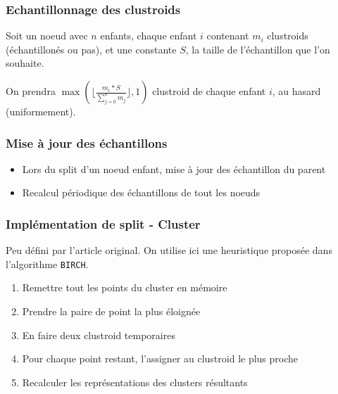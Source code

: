 \documentclass{beamer}
\begin{document}
 	
 	\begin{frame}
 		\frametitle{Echantillonnage des clustroids}
 		Soit un noeud avec $n$ enfants, chaque enfant $i$ contenant $m_i$ clustroids (échantillonés ou pas), et une constante $S$, la taille de l'échantillon que l'on souhaite.
 		
 		On prendra $\max(\lfloor\frac{m_i*S}{\sum_{j=0}^n m_j}\rfloor,1)$ clustroid de chaque enfant $i$, au hasard (uniformement).
 	\end{frame}
 	
 	\begin{frame}
 		\frametitle{Mise à jour des échantillons}
 		\begin{itemize}
 			\item Lors du split d'un noeud enfant, mise à jour des échantillon du parent
 			\item Recalcul périodique des échantillons de tout les noeuds
 		\end{itemize}
 	\end{frame}
 	
 	\begin{frame}
 		\frametitle{Implémentation de split - Cluster}
 		Peu défini par l'article original. On utilise ici une heuristique proposée dans l'algorithme \texttt{BIRCH}.
 		\begin{enumerate}
 			\item Remettre tout les points du cluster en mémoire
 			\item Prendre la paire de point la plus éloignée
 			\item En faire deux clustroid temporaires
 			\item Pour chaque point restant, l'assigner au clustroid le plus proche
 			\item Recalculer les représentations des clusters résultants
 		\end{enumerate}
 	\end{frame}
 	
\end{document}
